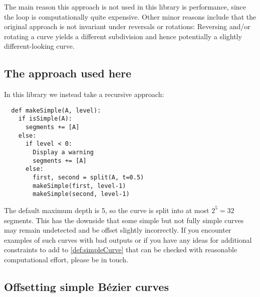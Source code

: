 \documentclass[12pt,a4paper]{article}
\theoremstyle{definition}
\begin{document}
The main reason this approach is not used in this library is performance, since the loop is computationally quite expensive. Other minor reasons include that the original approach is not invariant under reversals or rotations: Reversing and/or rotating a curve yields a different subdivision and hence potentially a slightly different-looking curve.

\subsection{The approach used here}
\label{subsec:subdivisionUsed}
In this library we instead take a recursive approach:
\begin{verbatim}
  def makeSimple(A, level):
    if isSimple(A):
      segments += [A]
    else:
      if level < 0:
        Display a warning
        segments += [A]
      else:
        first, second = split(A, t=0.5)
        makeSimple(first, level-1)
        makeSimple(second, level-1)
\end{verbatim}
The default maximum depth is 5, so the curve is split into at most $2^5 = 32$ segments. This has the downside that some simple but not fully simple curves may remain undetected and be offset slightly incorrectly. If you encounter examples of such curves with bad outputs or if you have any ideas for additional constraints to add to \cref{def:simpleCurve} that can be checked with reasonable computational effort, please be in touch.


\subsection{Offsetting simple Bézier curves}
\end{document}
